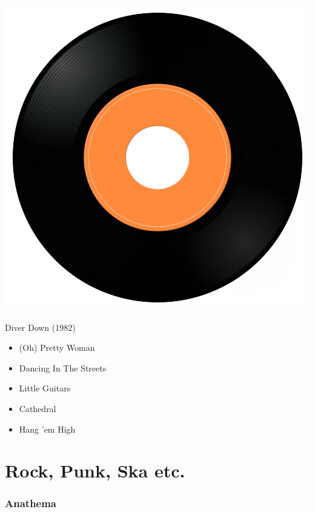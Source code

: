 \begin{minipage}[t]{0.25\textwidth}
\captionsetup{type=figure}
\includegraphics[width=\textwidth]{Images/cover.png}
\caption*{Diver Down (1982)}
\end{minipage}
\begin{minipage}[t]{0.25\textwidth}\vspace{0pt}
\begin{itemize}[nosep,leftmargin=1em,labelwidth=*,align=left]
	\setlength{\itemsep}{0pt}
	\item (Oh) Pretty Woman
	\item Dancing In The Streets
	\item Little Guitars
	\item Cathedral
	\item Hang 'em High
\end{itemize}
\end{minipage}


\section{Rock, Punk, Ska etc.}

\subsubsection{Anathema}

